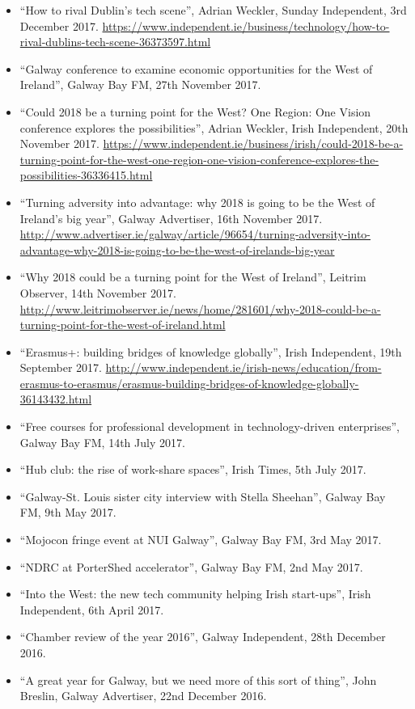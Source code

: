 \documentclass[10pt,a4paper]{res} %
\begin{document}
\begin{resume}
{\begin{itemize}
\item ``How to rival Dublin's tech scene'', Adrian Weckler, Sunday Independent, 3rd December 2017. \url{https://www.independent.ie/business/technology/how-to-rival-dublins-tech-scene-36373597.html}
\item ``Galway conference to examine economic opportunities for the West of Ireland'', Galway Bay FM, 27th November 2017.
\item ``Could 2018 be a turning point for the West? One Region: One Vision conference explores the possibilities'', Adrian Weckler, Irish Independent, 20th November 2017. \url{https://www.independent.ie/business/irish/could-2018-be-a-turning-point-for-the-west-one-region-one-vision-conference-explores-the-possibilities-36336415.html}
\item ``Turning adversity into advantage: why 2018 is going to be the West of Ireland's big year'', Galway Advertiser, 16th November 2017. \url{http://www.advertiser.ie/galway/article/96654/turning-adversity-into-advantage-why-2018-is-going-to-be-the-west-of-irelands-big-year}
\item ``Why 2018 could be a turning point for the West of Ireland'', Leitrim Observer, 14th November 2017. \url{http://www.leitrimobserver.ie/news/home/281601/why-2018-could-be-a-turning-point-for-the-west-of-ireland.html}
\item ``Erasmus+: building bridges of knowledge globally'', Irish Independent, 19th September 2017. \url{http://www.independent.ie/irish-news/education/from-erasmus-to-erasmus/erasmus-building-bridges-of-knowledge-globally-36143432.html}
\item ``Free courses for professional development in technology-driven enterprises'', Galway Bay FM, 14th July 2017.
\item ``Hub club: the rise of work-share spaces'', Irish Times, 5th July 2017.
\item ``Galway-St. Louis sister city interview with Stella Sheehan'', Galway Bay FM, 9th May 2017.
\item ``Mojocon fringe event at NUI Galway'', Galway Bay FM, 3rd May 2017.
\item ``NDRC at PorterShed accelerator'', Galway Bay FM, 2nd May 2017.
\item ``Into the West: the new tech community helping Irish start-ups'', Irish Independent, 6th April 2017.
\item ``Chamber review of the year 2016'', Galway Independent, 28th December 2016.
\item ``A great year for Galway, but we need more of this sort of thing'', John Breslin, Galway Advertiser, 22nd December 2016.

\end{itemize}}
\end{resume}
\end{document}
